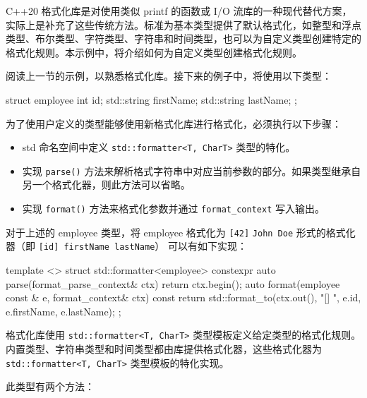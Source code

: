 
C++20 格式化库是对使用类似 printf 的函数或 I/O 流库的一种现代替代方案，实际上是补充了这些传统方法。标准为基本类型提供了默认格式化，如整型和浮点类型、布尔类型、字符类型、字符串和时间类型，也可以为自定义类型创建特定的格式化规则。本示例中，将介绍如何为自定义类型创建格式化规则。


阅读上一节的示例，以熟悉格式化库。接下来的例子中，将使用以下类型：

\begin{cpp}
struct employee
{
    int         id;
    std::string firstName;
    std::string lastName;
};
\end{cpp}


为了使用户定义的类型能够使用新格式化库进行格式化，必须执行以下步骤：

\begin{itemize}
\item
std 命名空间中定义 \verb|std::formatter<T, CharT>| 类型的特化。

\item
实现 \verb|parse()| 方法来解析格式字符串中对应当前参数的部分。如果类型继承自另一个格式化器，则此方法可以省略。

\item
实现 \verb|format()| 方法来格式化参数并通过 \verb|format_context| 写入输出。
\end{itemize}

对于上述的 employee 类型，将 employee 格式化为  \verb|[42]| \verb|John Doe| 形式的格式化器（即 \verb|[id] firstName lastName|） 可以有如下实现：

\begin{cpp}
template <>
struct std::formatter<employee>
{
    constexpr auto parse(format_parse_context& ctx)
    {
        return ctx.begin();
    }
    auto format(employee const & e, format_context& ctx) const
    {
        return std::format_to(ctx.out(),
        "[{}] {} {}",
        e.id, e.firstName, e.lastName);
    }
};
\end{cpp}


格式化库使用 \verb|std::formatter<T, CharT>| 类型模板定义给定类型的格式化规则。内置类型、字符串类型和时间类型都由库提供格式化器，这些格式化器为 \verb|std::formatter<T, CharT>| 类型模板的特化实现。

此类型有两个方法：

